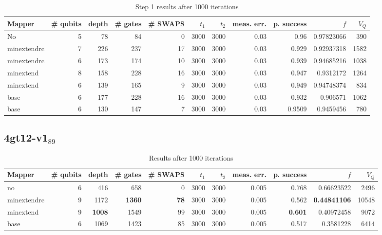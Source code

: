 \documentclass[11pt]{article}
\begin{document}
\begin{table}[H]
\caption{\label{tab:org3aad440}
Step 1 results after 1000 iterations}
\centering
\begin{tabular}{lrrrrrrrrrr}
\hline
Mapper & \# qubits & depth & \# gates & \# SWAPS & \(t_1\) & \(t_2\) & meas. err. & p. success & \(f\) & \(V_Q\)\\
\hline
No & 5 & 78 & 84 & 0 & 3000 & 3000 & 0.03 & 0.96 & 0.97823066 & 390\\
\hline
minextendrc & 7 & 226 & 237 & 17 & 3000 & 3000 & 0.03 & 0.929 & 0.92937318 & 1582\\
minextendrc & 6 & 173 & 174 & 10 & 3000 & 3000 & 0.03 & 0.939 & 0.94685216 & 1038\\
minextend & 8 & 158 & 228 & 16 & 3000 & 3000 & 0.03 & 0.947 & 0.9312172 & 1264\\
minextend & 6 & 139 & 165 & 9 & 3000 & 3000 & 0.03 & 0.949 & 0.94748374 & 834\\
base & 6 & 177 & 228 & 16 & 3000 & 3000 & 0.03 & 0.932 & 0.906571 & 1062\\
base & 6 & 130 & 147 & 7 & 3000 & 3000 & 0.03 & 0.9509 & 0.9459456 & 780\\
\hline
\end{tabular}
\end{table}

\subsection{4gt12-v1\(_{\text{89}}\)}
\label{sec:org1269bd7}

\begin{table}[!htpb]
\caption{\label{tab:orgbbfb0ea}
Results after 1000 iterations}
\centering
\begin{tabular}{lrrrrrrrrrr}
\hline
Mapper & \# qubits & depth & \# gates & \# SWAPS & \(t_1\) & \(t_2\) & meas. err. & p. success & \(f\) & \(V_Q\)\\
\hline
no & 6 & 416 & 658 & 0 & 3000 & 3000 & 0.005 & 0.768 & 0.66623522 & 2496\\
\hline
minextendrc & 9 & 1172 & \textbf{1360} & \textbf{78} & 3000 & 3000 & 0.005 & 0.562 & \textbf{0.44841106} & 10548\\
minextend & 9 & \textbf{1008} & 1549 & 99 & 3000 & 3000 & 0.005 & \textbf{0.601} & 0.40972458 & 9072\\
base & 6 & 1069 & 1423 & 85 & 3000 & 3000 & 0.005 & 0.517 & 0.3581228 & 6414\\
\hline
\end{tabular}
\end{table}
\end{document}
